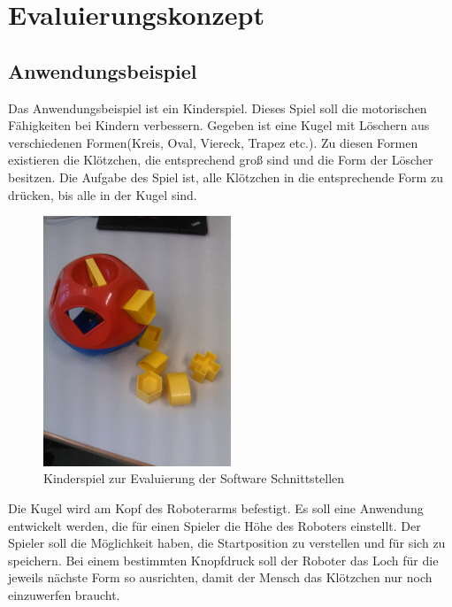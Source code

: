 \chapter{Evaluierungskonzept}
\label{konzept_kon}

\section{Anwendungsbeispiel}
\label{sec:anwendung_kon}

Das Anwendungsbeispiel ist ein Kinderspiel. Dieses Spiel soll die motorischen Fähigkeiten bei Kindern verbessern.
Gegeben ist eine Kugel mit Löschern aus verschiedenen Formen(Kreis, Oval, Viereck, Trapez etc.). Zu diesen Formen existieren die  Klötzchen, die entsprechend groß sind und die Form der Löscher besitzen. Die Aufgabe des Spiel ist, alle Klötzchen in die entsprechende Form zu drücken, bis alle in der Kugel sind.

\begin{figure}[H]
  \centering
    \includegraphics[width=0.5\textwidth]{pic/spiel.jpg}
      \caption[Kinder Geschicklichkeitsspiel]{Kinderspiel zur Evaluierung der Software Schnittstellen}
      \label{fig:kinderspiel}
\end{figure}
\newpage

Die Kugel wird am Kopf des Roboterarms befestigt. Es soll eine Anwendung entwickelt werden, die für einen Spieler die Höhe des Roboters einstellt. Der Spieler soll die Möglichkeit haben, die Startposition zu verstellen und für sich zu speichern. Bei einem bestimmten Knopfdruck soll der Roboter das Loch für die jeweils nächste Form so ausrichten, damit der Mensch das Klötzchen nur noch einzuwerfen braucht.

